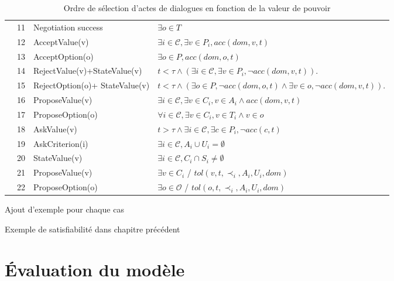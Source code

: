 \begin{table}[!t]
\begin{tabular}{|p{.5cm}|p{.9cm}|p{4cm}|p{7.5cm}|}
			\hline
			
			\parbox[t]{2mm}{
				} & 11& Negotiation success &  $\exists o \in T$ \\
			&12& AcceptValue(v) & $\exists i\in\mathcal{C}, \exists v \in P_i, acc(dom, v, t)$ \\
			&13&AcceptOption(o) & $\exists o \in P, acc(dom, o, t)$ \\
			&14&RejectValue(v)+\newline StateValue(v) & $ t<\tau \land (\exists i\in\mathcal{C}, \exists v \in P_i, \neg acc(dom,v, t))$.\\
			&15&RejectOption(o)+ \newline StateValue(v) & $ t<\tau \land (\exists o \in P,  \neg acc(dom,o, t) \land \exists v \in o, \neg acc(dom,v, t))$.\\
			&16&ProposeValue(v) &  $\exists i\in\mathcal{C}, \exists v \in C_i, v \in A_i  \land acc(dom, v, t) $\\
			&17&ProposeOption(o)  & $\forall i\in\mathcal{C},\exists v \in C_i, v \in T_i  \land v \in o$ \\
			&18&AskValue(v) & $t > \tau \land \exists i\in\mathcal{C}, \exists c \in P_i, \neg acc(c, t)$ \\
			&19&AskCriterion(i) & $\exists i\in\mathcal{C}, A_i \cup U_i= \emptyset $\\
			&20&StateValue(v) & $\exists i\in\mathcal{C}, C_i\cap S_i \neq \emptyset$	\\
			&21& ProposeValue(v) & $\exists v \in C_i$ / $tol(v, t, \prec_i, A_i, U_i, dom)$\\
			&22& ProposeOption(o) & $\exists o \in \mathcal{O}$ / $tol(o, t, \prec_i, A_i, U_i, dom)$\\
			
			\hline
		\end{tabular}
		
		\caption{Ordre de sélection d'actes de dialogues en fonction de la valeur de pouvoir}
		\label{table:uttChoice}
	\end{table}
	
	Ajout d'exemple pour chaque cas
	
	Exemple de satisfiabilité dans chapitre précédent
	
	
	\section{Évaluation du modèle}